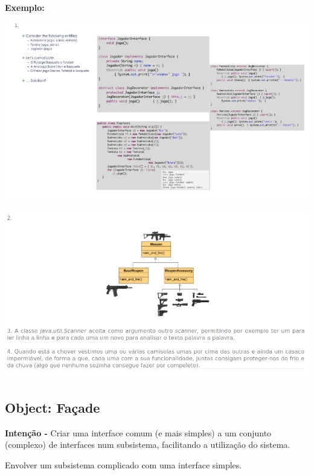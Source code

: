 \documentclass{article}
\begin{document}
\begin{flushleft}
    \textbf{Exemplo:}

    \begin{center}
            \includegraphics[scale=0.55]{Images/48.png}
    \end{center}

    \begin{center}
        \includegraphics[scale=0.4]{Images/49.png}
\end{center}
\end{flushleft}

\pagebreak

\subsection{Object: Façade}

\begin{flushleft}
    \textbf{Intenção -} Criar uma interface comum (e mais simples) a um conjunto (complexo) de interfaces
    num subsistema, facilitando a utilização do sistema.

    Envolver um subsistema complicado com uma interface simples.
\end{flushleft}
\end{document}
